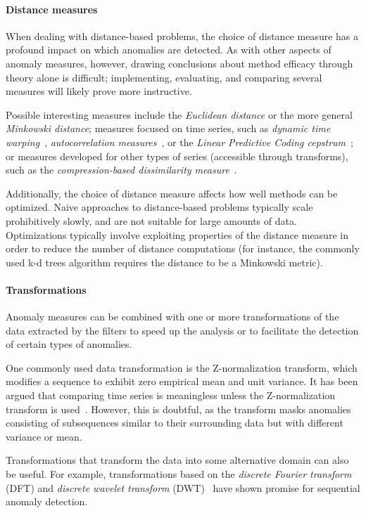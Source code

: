 \paragraph{Distance measures}
\label{sect:distance_mezurez}

When dealing with distance-based problems, the choice of distance measure has a profound impact on which anomalies are detected. As with other aspects of anomaly measures, however, drawing conclusions about method efficacy through theory alone is difficult; implementing, evaluating, and comparing several measures will likely prove more instructive.

Possible interesting measures include the \emph{Euclidean distance} or the more general \emph{Minkowski distance}; measures focused on time series, such as \emph{dynamic time warping}~\cite{dtw}, \emph{autocorrelation measures}~\cite{autocorrelation}, or the \emph{Linear Predictive Coding cepstrum}~\cite{cepstrum}; or measures developed for other types of series (accessible through transforms), such as the \emph{compression-based dissimilarity measure}~\cite{keogh2}.

Additionally, the choice of distance measure affects how well methods can be optimized. Naive approaches to distance-based problems typically scale prohibitively slowly, and are not suitable for large amounts of data. Optimizations typically involve exploiting properties of the distance measure in order to reduce the number of distance computations (for instance, the commonly used k-d trees algorithm requires the distance to be a Minkowski metric).

\paragraph{Transformations}
Anomaly measures can be combined with one or more transformations of the data extracted by the filters to speed up the analysis or to facilitate the detection of certain types of anomalies.

One commonly used data transformation is the Z-normalization transform, which modifies a sequence to exhibit zero empirical mean and unit variance. It has been argued that comparing time series is meaningless unless the Z-normalization transform is used~\cite{keogh5}. However, this is doubtful, as the transform masks anomalies consisting of subsequences similar to their surrounding data but with different variance or mean.

Transformations that transform the data into some alternative domain can also be useful. For example, transformations based on the \emph{discrete Fourier transform} (DFT) and \emph{discrete wavelet transform} (DWT)~\cite{fu} have shown promise for sequential anomaly detection.

